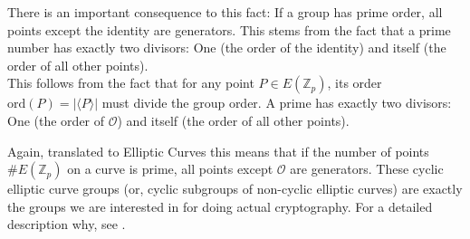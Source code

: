 There is an important consequence to this fact: If a group has prime order, all points except the identity are generators.
This stems from the fact that a prime number has exactly two divisors: One (the order of the identity) and itself (the order of all other points).
\\
This follows from the fact that for any point $P \in E(\mathbb{Z}_p)$, its order $\text{ord}(P) = | \langle P \rangle |$ must divide the group order.
A prime has exactly two divisors: One (the order of $\mathcal{O}$) and itself (the order of all other points).

Again, translated to Elliptic Curves this means that if the number of points $\#E(\mathbb{Z}_p)$ on a curve is prime, all points except $\mathcal{O}$ are generators.
These cyclic elliptic curve groups (or, cyclic subgroups of non-cyclic elliptic curves) are exactly the groups we are interested in for doing actual cryptography. For a detailed description why, see \cite[p.~321]{katz_introduction_2015}.







